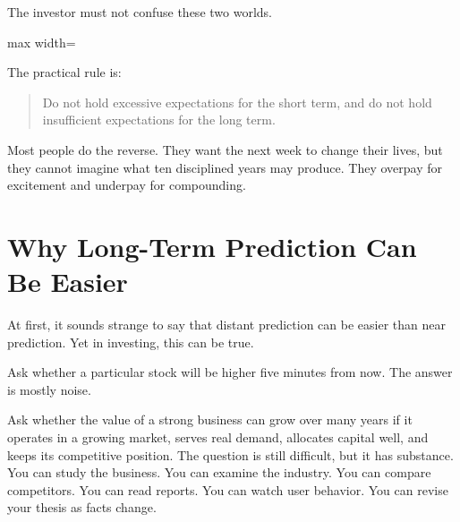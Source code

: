 The investor must not confuse these two worlds.

\begin{center}
\begin{adjustbox}{max width=\linewidth}
\end{adjustbox}
\end{center}

The practical rule is:

\begin{quote}
Do not hold excessive expectations for the short term, and do not hold insufficient expectations for the long term.
\end{quote}

Most people do the reverse. They want the next week to change their lives, but they cannot imagine what ten disciplined years may produce. They overpay for excitement and underpay for compounding.

\section*{Why Long-Term Prediction Can Be Easier}

At first, it sounds strange to say that distant prediction can be easier than near prediction. Yet in investing, this can be true.

Ask whether a particular stock will be higher five minutes from now. The answer is mostly noise.

Ask whether the value of a strong business can grow over many years if it operates in a growing market, serves real demand, allocates capital well, and keeps its competitive position. The question is still difficult, but it has substance. You can study the business. You can examine the industry. You can compare competitors. You can read reports. You can watch user behavior. You can revise your thesis as facts change.

